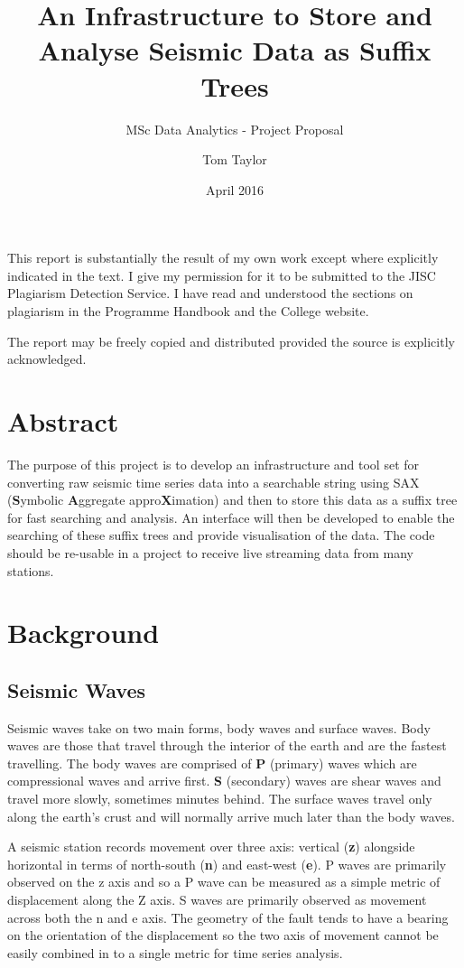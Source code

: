 \documentclass[11pt]{scrartcl}
\title{An Infrastructure to Store and Analyse Seismic Data as Suffix Trees}
\subtitle{MSc Data Analytics - Project Proposal}
\date{April 2016}
\author{Tom Taylor}
\begin{document}
\maketitle
\begin{itshape}
	\noindent This report is substantially the result of my own work except where explicitly
	indicated in the text. I give my permission for it to be submitted to the JISC
	Plagiarism Detection Service. I have read and understood the sections on plagiarism
	in the Programme Handbook and the College website.
	
	\noindent The report may be freely copied and distributed provided the source is explicitly
	acknowledged.
\end{itshape}

\tableofcontents

\newpage

\section{Abstract}
	The purpose of this project is to develop an infrastructure and tool set for converting raw seismic time series data into a searchable string using SAX (\textbf{S}ymbolic \textbf{A}ggregate appro\textbf{X}imation) and then to store this data as a suffix tree for fast searching and analysis.  An interface will then be developed to enable the searching of these suffix trees and provide visualisation of the data.  The code should be re-usable in a project to receive live streaming data from many stations.
	
\section{Background}
\subsection{Seismic Waves}
	Seismic waves take on two main forms, body waves and surface waves.  Body waves are those that travel through the interior of the earth and are the fastest travelling.  The body waves are comprised of \textbf{P} (primary) waves which are compressional waves and arrive first.  \textbf{S} (secondary) waves are shear waves and travel more slowly, sometimes minutes behind.  The surface waves travel only along the earth's crust and will normally arrive much later than the body waves.
	
	A seismic station records movement over three axis: vertical (\textbf{z}) alongside horizontal in terms of north-south (\textbf{n}) and east-west (\textbf{e}).  P waves are primarily observed on the z axis and so a P wave can be measured as a simple metric of displacement along the Z axis.  S waves are primarily observed as movement across both the n and e axis.  The geometry of the fault tends to have a bearing on the orientation of the displacement so the two axis of movement cannot be easily combined in to a single metric for time series analysis.
	
\end{document}
